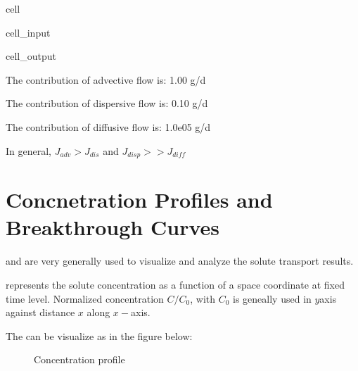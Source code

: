 \documentclass[letterpaper,10pt,english]{jupyterBook}
\begin{document}
\begin{sphinxuseclass}{cell}
\begin{sphinxVerbatimInput}
\begin{sphinxuseclass}{cell_input}
\end{sphinxuseclass}\end{sphinxVerbatimInput}
\begin{sphinxVerbatimOutput}

\begin{sphinxuseclass}{cell_output}
\begin{sphinxVerbatim}[commandchars=\\\{\}]
 The contribution of advective flow is: 1.00 g/d 

The contribution of dispersive flow is: 0.10 g/d 

The contribution of diffusive flow is: 1.0e\PYGZhy{}05 g/d 
\end{sphinxVerbatim}

\end{sphinxuseclass}\end{sphinxVerbatimOutput}

\end{sphinxuseclass}
\sphinxAtStartPar
In general, \(J_{adv} > J_{dis} \) and  \(J_{disp} >> J_{diff} \)


\section{Concnetration Profiles and Breakthrough Curves}
\label{\detokenize{content/transport/L9/21_conservative_transport:concnetration-profiles-and-breakthrough-curves}}
\sphinxAtStartPar
{} and  are very generally used to visualize and analyze the solute transport results.

\sphinxAtStartPar
{} represents  the solute concentration as a function of a space coordinate at fixed time level. Normalized concentration \(C/C_0\), with \(C_0\) is geneally used in \(y\)\sphinxhyphen{}axis against distance \(x\) along \(x-\)axis.

\sphinxAtStartPar
The  can be visualize as in the figure below:

\begin{figure}[htbp]
\centering
\capstart

\noindent{}
\caption{Concentration profile}\label{\detokenize{content/transport/L9/21_conservative_transport:c-profile}}\end{figure}
\end{document}
